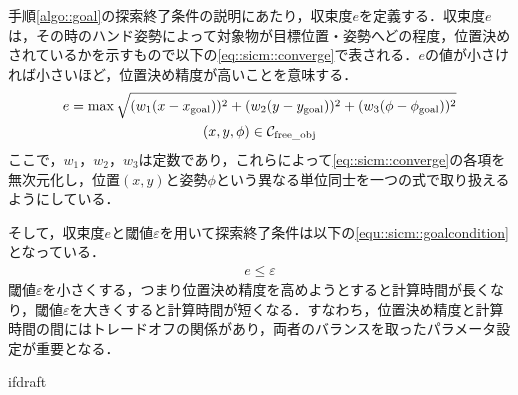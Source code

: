 \documentclass[a4paper,twoside,12pt,papersize, dvipdfmx]{iirthesis}
\begin{document}
手順\ref{algo::goal}の探索終了条件の説明にあたり，収束度$e$を定義する．収束度$e$は，その時のハンド姿勢によって対象物が目標位置・姿勢へどの程度，位置決めされているかを示すもので以下の\eqref{eq::sicm::converge}で表される．$e$の値が小さければ小さいほど，位置決め精度が高いことを意味する．
\begin{gather}
\label{eq::sicm::converge}
e = \max \sqrt{(w_1(x-x_{\mathrm{goal}}))^2+(w_2(y-y_{\mathrm{goal}}))^2 + (w_3(\phi-\phi_{\mathrm{goal}}))^2}\label{eq::sicm::e} \\
(x, y, \phi) \in \mathcal{C}_{\mathrm{free\_obj}} \notag
\end{gather}
ここで，$w_1$，$w_2$，$w_3$は定数であり，これらによって\eqref{eq::sicm::converge}の各項を無次元化し，位置$(x, y)$と姿勢$\phi$という異なる単位同士を一つの式で取り扱えるようにしている．\par
そして，収束度$e$と閾値$\varepsilon$を用いて探索終了条件は以下の\eqref{equ::sicm::goalcondition}となっている．
\begin{gather}
e \leq \varepsilon
\end{gather}
閾値$\varepsilon$を小さくする，つまり位置決め精度を高めようとすると計算時間が長くなり，閾値$\varepsilon$を大きくすると計算時間が短くなる．すなわち，位置決め精度と計算時間の間にはトレードオフの関係があり，両者のバランスを取ったパラメータ設定が重要となる．

\expandafter\ifx\csname ifdraft\endcsname\relax
    
\end{document}
